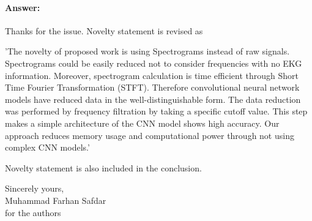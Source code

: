 \documentclass{article}
\begin{document}
\paragraph{Answer:}
Thanks for the issue. Novelty statement is revised as


'The novelty of proposed work is using Spectrograms instead of raw signals. Spectrograms could be easily reduced not to consider frequencies with no EKG information. Moreover, spectrogram calculation is time efficient through Short Time Fourier Transformation (STFT). Therefore convolutional neural network models have reduced data in the well-distinguishable form. The data reduction was performed by frequency filtration by taking a specific cutoff value. This step makes a simple architecture of the CNN model shows high accuracy. Our approach reduces memory usage and computational power through not using complex CNN models.'

Novelty statement is also included in the conclusion.

\vspace{0.5cm}

Sincerely yours,\\
Muhammad Farhan Safdar\\
for the authors
\end{document}
